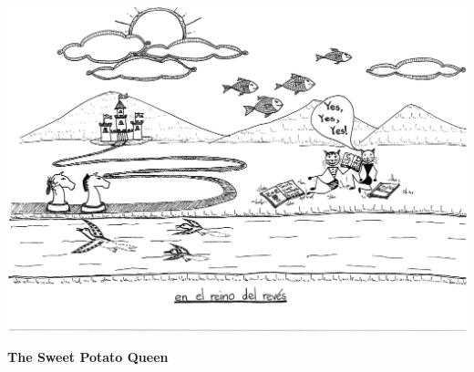 \documentclass[11pt,a4paper]{article}
\begin{document}
\bigskip
\centerline{\includegraphics[page=4,scale=0.7,clip=true,trim = 0cm 3mm 0cm 0cm]{20150406235752619.pdf}}
\begin{center}\large\textbf{The Sweet Potato Queen}\end{center}
\end{document}
